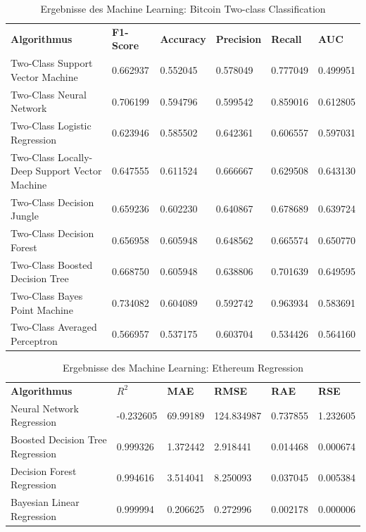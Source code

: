 \begin{table}[H]
\centering
\begin{tabular}{|p{5cm}|p{}|p{}|p{}|p{}|p{}|}
\hline
\textbf{Algorithmus} & \textbf{F1-Score} & \textbf{Accuracy} & \textbf{Precision} & \textbf{Recall} & \textbf{AUC}\\ 
\hhline{======}
Two-Class Support Vector Machine & 0.662937 & 0.552045 & 0.578049 & 0.777049 & 0.499951 \\ \hline
Two-Class Neural Network & 0.706199 & 0.594796 & 0.599542 & 0.859016 & 0.612805 \\ \hline
Two-Class Logistic Regression & 0.623946 & 0.585502 & 0.642361 & 0.606557 & 0.597031 \\ \hline
Two-Class Locally-Deep Support Vector Machine & 0.647555 & 0.611524 & 0.666667 & 0.629508 & 0.643130 \\ \hline
Two-Class Decision Jungle & 0.659236 & 0.602230 & 0.640867 & 0.678689 & 0.639724 \\ \hline
Two-Class Decision Forest & 0.656958 & 0.605948 & 0.648562 & 0.665574 & 0.650770 \\ \hline
Two-Class Boosted Decision Tree & 0.668750 & 0.605948 & 0.638806 & 0.701639 & 0.649595 \\ \hline
Two-Class Bayes Point Machine & 0.734082 & 0.604089 & 0.592742 & 0.963934 & 0.583691 \\ \hline
Two-Class Averaged Perceptron & 0.566957 & 0.537175 & 0.603704 & 0.534426 & 0.564160 \\ \hline
\end{tabular}
\caption{Ergebnisse des Machine Learning: Bitcoin Two-class Classification}
\label{tab:BTC2}
\end{table}

\begin{table}[H]
\centering
\begin{tabular}{|p{4cm}|p{}|p{}|p{}|p{}|p{}|}
\hline
\textbf{Algorithmus} & \textbf{$ R^2 $} & \textbf{MAE} & \textbf{RMSE} & \textbf{RAE} & \textbf{RSE}\\ 
\hhline{======}
Neural Network Regression & -0.232605 & 69.99189 & 124.834987 & 0.737855 & 1.232605 \\ \hline
Boosted Decision Tree Regression & 0.999326 & 1.372442 & 2.918441 & 0.014468 & 0.000674 \\ \hline
Decision Forest Regression & 0.994616 & 3.514041 & 8.250093 & 0.037045 & 0.005384 \\ \hline
Bayesian Linear Regression & 0.999994 & 0.206625 & 0.272996 & 0.002178 & 0.000006 \\ \hline
\end{tabular}
\caption{Ergebnisse des Machine Learning: Ethereum Regression}
\label{tab:ETHREg}
\end{table}

